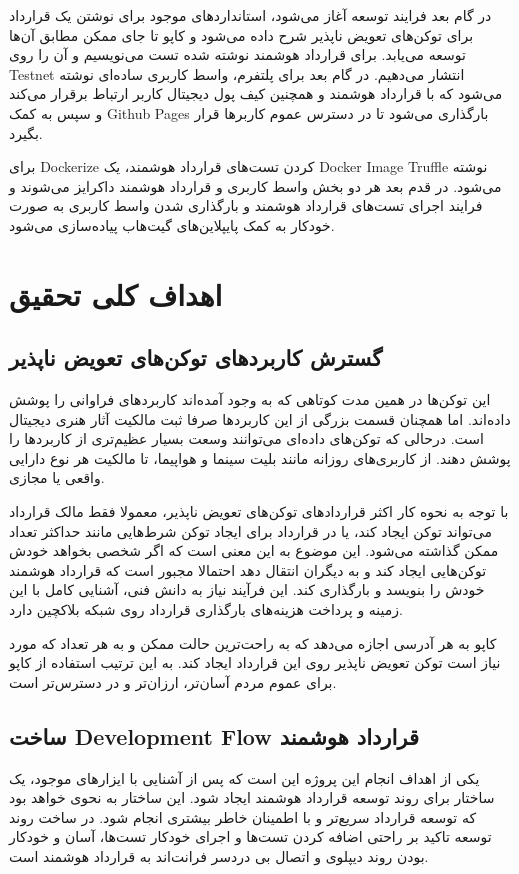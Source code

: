 در گام بعد فرایند توسعه آغاز می‌شود،
استاندارد‌های موجود برای نوشتن یک قرارداد برای توکن‌های تعویض ناپذیر شرح داده می‌شود و
کاپو تا جای ممکن مطابق آن‌ها توسعه می‌یابد.
برای قرارداد هوشمند نوشته شده تست می‌نویسیم و آن را روی
\gls{Testnet}
انتشار می‌دهیم.
در گام بعد برای پلتفرم،
واسط کاربری ساده‌ای نوشته می‌شود که با قرارداد هوشمند و
همچنین کیف پول دیجیتال کاربر ارتباط برقرار می‌کند و سپس به کمک
\gls{Github Pages}
بارگذاری می‌شود تا در دسترس عموم کاربرها قرار بگیرد.

برای
\gls{Dockerize}
کردن تست‌های قرارداد هوشمند، یک
\gls{Docker Image}
\gls{Truffle}
نوشته می‌شود.
در قدم بعد هر دو بخش واسط کاربری و قرارداد هوشمند داکرایز می‌شوند
و فرایند اجرای تست‌های قرارداد هوشمند
و بارگذاری شدن واسط کاربری به صورت خودکار به کمک پایپلاین‌های گیت‌هاب پیاده‌سازی می‌شود.


\section{اهداف کلی تحقیق}
\subsection{گسترش کاربرد‌های توکن‌های تعویض ناپذیر}
این توکن‌ها در همین مدت کوتاهی که به وجود آمده‌اند کاربردهای فراوانی را پوشش داده‌اند.
اما همچنان قسمت بزرگی از این کاربردها صرفا ثبت مالکیت آثار هنری دیجیتال است.
درحالی که توکن‌های داده‌ای می‌توانند وسعت بسیار عظیم‌تری از کاربردها را پوشش دهند.
از کاربری‌های روزانه مانند بلیت سینما و هواپیما، تا مالکیت هر نوع دارایی واقعی یا مجازی.

با توجه به نحوه کار اکثر قراردادهای توکن‌های تعویض ناپذیر،
معمولا فقط مالک قرارداد می‌تواند توکن ایجاد کند،
یا در قرارداد برای ایجاد توکن شرط‌هایی مانند حداکثر تعداد ممکن گذاشته می‌شود.
این موضوع به این معنی است که اگر شخصی بخواهد خودش توکن‌هایی ایجاد کند
و به دیگران انتقال دهد احتمالا مجبور است که قرارداد هوشمند خودش را بنویسد و بارگذاری کند.
این فرآیند نیاز به دانش فنی، آشنایی کامل با این زمینه و پرداخت هزینه‌های بارگذاری قرارداد روی شبکه بلاکچین دارد.

کاپو به هر آدرسی اجازه می‌دهد که به راحت‌ترین حالت ممکن
و به هر تعداد که مورد نیاز است توکن تعویض ناپذیر روی این قرارداد ایجاد کند.
به این ترتیب استفاده از کاپو برای عموم مردم آسان‌تر، ارزان‌تر و در دسترس‌تر است.


\subsection{ساخت
\gls{Development Flow}
قرارداد هوشمند}
یکی از اهداف انجام این پروژه این است که پس از آشنایی با ایزارهای موجود،
یک ساختار برای روند توسعه قرارداد هوشمند ایجاد شود.
این ساختار به نحوی خواهد بود که توسعه قرارداد سریع‌تر و با اطمینان خاطر بیشتری انجام شود.
در ساخت روند توسعه تاکید بر راحتی اضافه کردن تست‌ها و اجرای خودکار تست‌ها،
آسان و خودکار بودن روند دیپلوی و اتصال بی دردسر فرانت‌اند به قرارداد هوشمند است.

